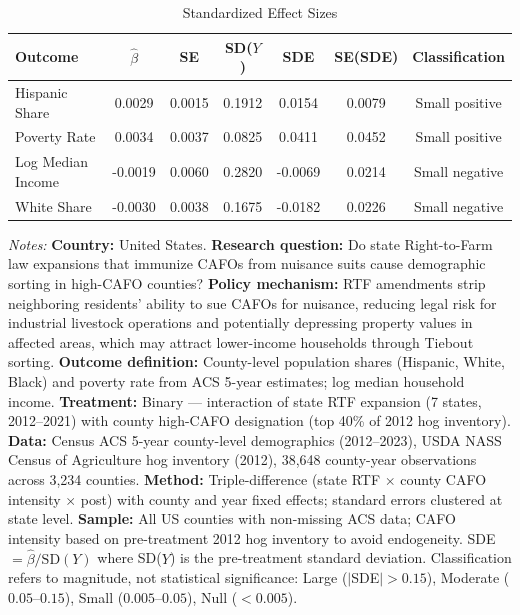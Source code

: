 \begin{table}[htbp]
\centering
\caption{Standardized Effect Sizes}
\label{tab:sde}
\begin{tabular}{lcccccc}
\hline\hline
Outcome & $\hat{\beta}$ & SE & SD($Y$) & SDE & SE(SDE) & Classification \\
\hline
Hispanic Share & 0.0029 & 0.0015 & 0.1912 & 0.0154 & 0.0079 & Small positive \\
Poverty Rate & 0.0034 & 0.0037 & 0.0825 & 0.0411 & 0.0452 & Small positive \\
Log Median Income & -0.0019 & 0.0060 & 0.2820 & -0.0069 & 0.0214 & Small negative \\
White Share & -0.0030 & 0.0038 & 0.1675 & -0.0182 & 0.0226 & Small negative \\
\hline\hline
\end{tabular}
\begin{tablenotes}[flushleft]
\item \textit{Notes:} \textbf{Country:} United States. \textbf{Research question:} Do state Right-to-Farm law expansions that immunize CAFOs from nuisance suits cause demographic sorting in high-CAFO counties? \textbf{Policy mechanism:} RTF amendments strip neighboring residents' ability to sue CAFOs for nuisance, reducing legal risk for industrial livestock operations and potentially depressing property values in affected areas, which may attract lower-income households through Tiebout sorting. \textbf{Outcome definition:} County-level population shares (Hispanic, White, Black) and poverty rate from ACS 5-year estimates; log median household income. \textbf{Treatment:} Binary --- interaction of state RTF expansion (7 states, 2012--2021) with county high-CAFO designation (top 40\% of 2012 hog inventory). \textbf{Data:} Census ACS 5-year county-level demographics (2012--2023), USDA NASS Census of Agriculture hog inventory (2012), 38,648 county-year observations across 3,234 counties. \textbf{Method:} Triple-difference (state RTF $\times$ county CAFO intensity $\times$ post) with county and year fixed effects; standard errors clustered at state level. \textbf{Sample:} All US counties with non-missing ACS data; CAFO intensity based on pre-treatment 2012 hog inventory to avoid endogeneity. SDE $= \hat{\beta} / \text{SD}(Y)$ where SD($Y$) is the pre-treatment standard deviation. Classification refers to magnitude, not statistical significance: Large ($|$SDE$| > 0.15$), Moderate ($0.05$--$0.15$), Small ($0.005$--$0.05$), Null ($< 0.005$).
\end{tablenotes}
\end{table}

